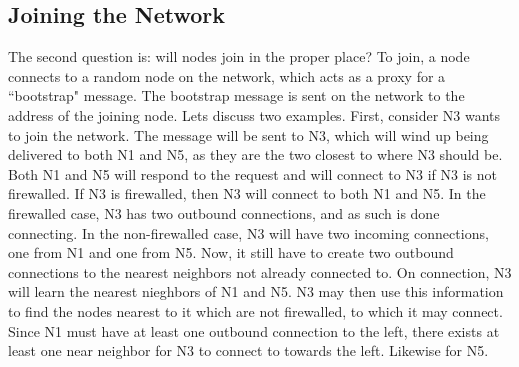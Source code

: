 \documentclass[11pt]{article}
\begin{document}
\subsection{Joining the Network}
The second question is: will nodes join in the proper place?  To join, a node
connects to a random node on the network, which acts as a proxy for a
``bootstrap" message.  The bootstrap message is sent on the network to the
address of the joining node.  Lets discuss two examples.  First, consider N3
wants to join the network.  The message will be sent to N3, which will wind up
being delivered to both N1 and N5, as they are the two closest to where N3
should be.  Both N1 and N5 will respond to the request and will connect to N3
if N3 is not firewalled.  If N3 is firewalled, then N3 will connect to both N1
and N5.  In the firewalled case, N3 has two outbound connections, and as such
is done connecting.  In the non-firewalled case, N3 will have two incoming
connections, one from N1 and one from N5.  Now, it still have to create two
outbound connections to the nearest neighbors not already connected to.  On
connection, N3 will learn the nearest nieghbors of N1 and N5.  N3 may then use
this information to find the nodes nearest to it which are not firewalled, to
which it may connect.  Since N1 must have at least one outbound connection to
the left, there exists at least one near neighbor for N3 to connect to towards
the left.  Likewise for N5.
\end{document}
